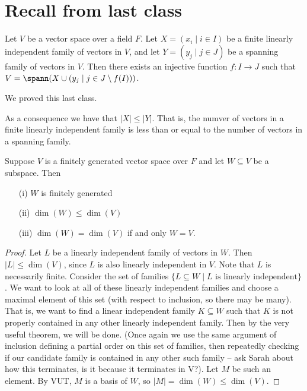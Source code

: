 
\section{Recall from last class}
\begin{lemma}
    Let \(V\) be a vector space over a field \(F\). Let \(X = (x_i \mid i \in I)\) be a finite linearly independent family of vectors in \(V\), and let \(Y = (y_j \mid j \in J)\) be a spanning family of vectors in \(V\). Then there exists an injective function \(f\colon I \to J\) such that \(V = \spann(X \cup (y_j \mid j \in J\setminus f(I)))\).
\end{lemma}
\begin{explanation}
    We proved this last class.
\end{explanation}
As a consequence we have that \(\vert X \vert \leq \vert Y \vert  \). That is, the numver of vectors in a finite linearly independent family is less than or equal to the number of vectors in a spanning family.

\begin{corollary}
    Suppose \(V\) is a finitely generated vector space over \(F\) and let \(W \subseteq V\) be a subspace. Then
    \begin{itemize}
        \item[(i)] \(W\) is finitely generated
        \item[(ii)] \(\dim(W)\leq \dim(V)\)
        \item[(iii)] \(\dim(W) = \dim(V)\) if and only \(W=V\).
    \end{itemize}
\end{corollary}
\begin{proof}
    Let \(L\) be a linearly independent family of vectors in \(W\). Then \(\vert L \vert \leq \dim(V) \), since \(L\) is also linearly independent in \(V\). Note that \(L\) is necessarily finite. Consider the set of families \(\{ L \subseteq W \mid L \text{ is linearly independent}  \} \). We want to look at all of these linearly independent families and choose a maximal element of this set (with respect to inclusion, so there may be many). That is, we want to find a linear independent family \(K \subseteq W\) such that \(K\) is not properly contained in any other linearly independent family. Then by the very useful theorem, we will be done. (Once again we use the same argument of inclusion defining a partial order on this set of families, then repeatedly checking if our candidate family is contained in any other such family -- ask Sarah about how this terminates, is it because it terminates in V?). Let \(M\) be such an element. By VUT, \(M\) is a basis of \(W\), so \(\vert M \vert = \dim(W) \leq \dim(V)\).
\end{proof}